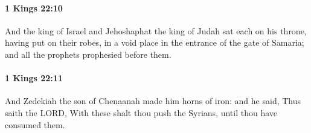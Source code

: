 		\paragraph{1 Kings 22:10} %
			\label{1KINGS-22-10}

			And the king of Israel and Jehoshaphat the king of Judah sat each on his throne, having put on their robes, in a void place in the entrance of the gate of Samaria; and all the prophets prophesied before them.


		\paragraph{1 Kings 22:11} %
			\label{1KINGS-22-11}

			And Zedekiah the son of Chenaanah made him horns of iron: and he said, Thus saith the LORD, With these shalt thou push the Syrians, until thou have consumed them.

